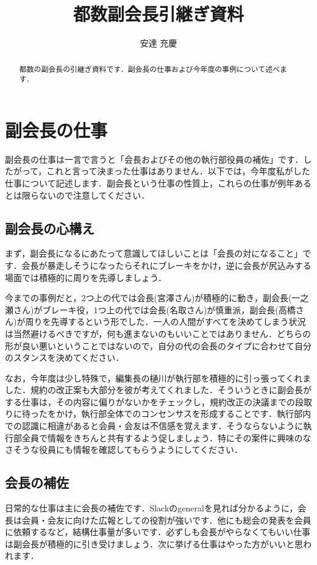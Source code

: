 \documentclass[uplatex]{jsarticle}
\title{都数副会長引継ぎ資料}
\author{安達 充慶}
\begin{document}
\maketitle

\begin{abstract}
    都数の副会長の引継ぎ資料です．副会長の仕事および今年度の事例について述べます．
\end{abstract}

\tableofcontents

\section{副会長の仕事}
副会長の仕事は一言で言うと「会長およびその他の執行部役員の補佐」です．したがって，これと言って決まった仕事はありません．以下では，今年度私がした仕事について記述します．副会長という仕事の性質上，これらの仕事が例年あるとは限らないので注意してください．

\subsection{副会長の心構え}
まず，副会長になるにあたって意識してほしいことは「会長の対になること」です．会長が暴走しそうになったらそれにブレーキをかけ，逆に会長が尻込みする場面では積極的に周りを先導しましょう．

今までの事例だと，2つ上の代では会長(宮澤さん)が積極的に動き，副会長(一之瀬さん)がブレーキ役，1つ上の代では会長(名取さん)が慎重派，副会長(高橋さん)が周りを先導するという形でした．一人の人間がすべてを決めてしまう状況は当然避けるべきですが，何も進まないのもいいことではありません．どちらの形が良い悪いということではないので，自分の代の会長のタイプに合わせて自分のスタンスを決めてください．

なお，今年度は少し特殊で，編集長の樋川が執行部を積極的に引っ張ってくれました．規約の改正案も大部分を彼が考えてくれました．そういうときに副会長がする仕事は，その内容に偏りがないかをチェックし，規約改正の決議までの段取りに待ったをかけ，執行部全体でのコンセンサスを形成することです．執行部内での認識に相違があると会員・会友は不信感を覚えます．そうならないように執行部全員で情報をきちんと共有するよう促しましょう．特にその案件に興味のなさそうな役員にも情報を確認してもらうようにしてください．

\subsection{会長の補佐}
日常的な仕事は主に会長の補佐です．Slackのgeneralを見れば分かるように，会長は会員・会友に向けた広報としての役割が強いです．他にも総会の発表を会員に依頼するなど，結構仕事量が多いです．必ずしも会長がやらなくてもいい仕事は副会長が積極的に引き受けましょう．次に挙げる仕事はやった方がいいと思われます．
\end{document}
